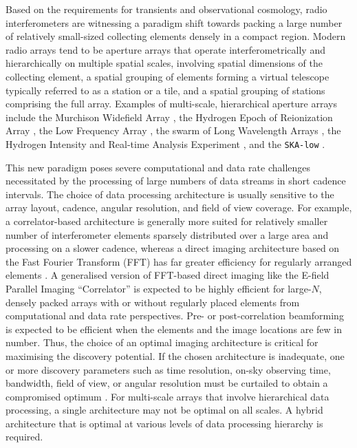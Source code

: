 \documentclass[
  journal=pasa,
  manuscript=article-type,
  year=2020,
  volume=37,
]{cup-journal}
\begin{document}
Based on the requirements for transients and observational cosmology, radio interferometers are witnessing a paradigm shift towards packing a large number of relatively small-sized collecting elements densely in a compact region. Modern radio arrays tend to be aperture arrays that operate interferometrically and hierarchically on multiple spatial scales, involving spatial dimensions of the collecting element, a spatial grouping of elements forming a virtual telescope typically referred to as a station or a tile, and a spatial grouping of stations comprising the full array.
Examples of multi-scale, hierarchical aperture arrays include the Murchison Widefield Array \cite[MWA;][]{Tingay+2013}, the Hydrogen Epoch of Reionization Array \citep[HERA;][]{HERA+2017}, the Low Frequency Array \cite[LOFAR;][]{vanHaarlem+2013}, the swarm of Long Wavelength Arrays \cite[LWA Swarm;][]{Dowell+2018}, 
the Hydrogen Intensity and Real-time Analysis Experiment \citep[HIRAX;][]{HIRAX+2022}, and the \texttt{SKA-low} \citep{Dewdney+2009,SKA1+2019}. 

This new paradigm poses severe computational and data rate challenges necessitated by the processing of large numbers of data streams in short cadence intervals. The choice of data processing architecture is usually sensitive to the array layout, cadence, angular resolution, and field of view coverage. For example, a correlator-based architecture is generally more suited for relatively smaller number of interferometer elements sparsely distributed over a large area and processing on a slower cadence, whereas a direct imaging architecture based on the Fast Fourier Transform (FFT) has far greater efficiency for regularly arranged elements \citep{Daishido+1991,Otobe+1994,Tegmark+2009,Tegmark+2010,Foster+2014,Masui+2019}. A generalised version of FFT-based direct imaging like the E-field Parallel Imaging ``Correlator'' \citep[EPIC;][]{Thyagarajan+2017,Thyagarajan+2019,Krishnan+2023} is expected to be highly efficient for large-$N$, densely packed arrays with or without regularly placed elements from computational and data rate perspectives. Pre- or post-correlation beamforming is expected to be efficient when the elements and the image locations are few in number. Thus, the choice of an optimal imaging architecture is critical for maximising the discovery potential. If the chosen architecture is inadequate, one or more discovery parameters such as time resolution, on-sky observing time, bandwidth, field of view, or angular resolution must be curtailed to obtain a compromised optimum \citep[for example,][]{Price2024}. For multi-scale arrays that involve hierarchical data processing, a single architecture may not be optimal on all scales. A hybrid architecture that is optimal at various levels of data processing hierarchy is required. 
\end{document}
